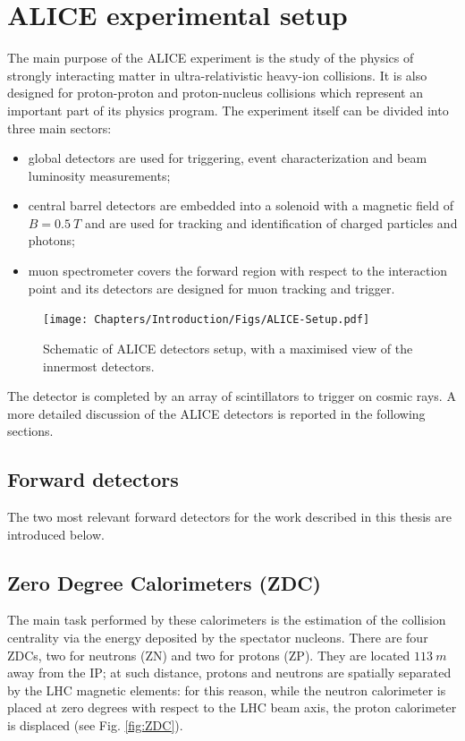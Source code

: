 \section{ALICE experimental setup} %
\label{ALICE_apparatus}
The main purpose of the ALICE experiment is the study of the physics of strongly interacting matter in ultra-relativistic heavy-ion collisions. It is also designed for proton-proton and proton-nucleus collisions which represent an important part of its physics program. The experiment itself can be divided into three main sectors:
\begin{itemize}
    \item global detectors are used for triggering, event characterization and beam luminosity measurements;
    \item central barrel detectors are embedded into a solenoid with a magnetic field of $B = 0.5\ T$ and are used for tracking and identification of charged particles and photons;
    \item muon spectrometer covers the forward region with respect to the interaction point and its detectors are designed for muon tracking and trigger.
\end{itemize}

\begin{figure}[!h]
\begin{center}
\texttt{[image: Chapters/Introduction/Figs/ALICE-Setup.pdf]}
\caption{Schematic of ALICE detectors setup, with a maximised view of the innermost detectors.}
\label{fig:ALICEsetup}
\end{center}
\end{figure}

The detector is completed by an array of scintillators to trigger on cosmic rays.
A more detailed discussion of the ALICE detectors is reported in the following sections.

\subsection{Forward detectors}
The two most relevant forward detectors for the work described in this thesis are introduced below.

\subsection{Zero Degree Calorimeters (ZDC)}
The main task performed by these calorimeters is the estimation of the collision centrality via the energy deposited by the spectator nucleons. 
There are four ZDCs, two for neutrons (ZN) and two for protons (ZP). 
They are located $113\ m$ away from the IP; at such distance, protons and neutrons are spatially separated by the LHC magnetic elements: for this reason, while the neutron calorimeter is placed at zero degrees with respect to the LHC beam axis, the proton calorimeter is displaced (see Fig. \ref{fig:ZDC}).

